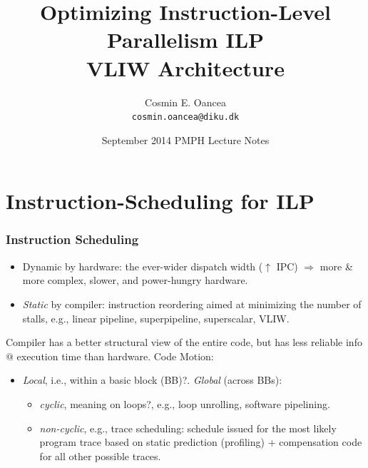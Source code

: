 \documentclass{beamer}
\title[VLIW Arch]{Optimizing Instruction-Level Parallelism ILP\\VLIW Architecture}
\author[C.~Oancea]{Cosmin E. Oancea\\{\tt cosmin.oancea@diku.dk}}
\institute{Department of Computer Science (DIKU)\\University of Copenhagen}
\date[Sept 2014]{September 2014 PMPH Lecture Notes}
\renewcommand{\emph}[1]{\textcolor{structure}{#1}}
\newcommand{\emp}[1]{\textcolor{DikuRed}{ #1}}
\begin{document}
\titleslide



\begin{frame}[fragile]
	\tableofcontents
\end{frame}


\section{Instruction-Scheduling for ILP}


\begin{frame}[fragile,t]
\frametitle{Instruction Scheduling}

\begin{itemize}
    \item {Dynamic} by hardware: the ever-wider dispatch width
            ($\uparrow$ IPC) $\Rightarrow$ 
            more \& more complex, slower, and power-hungry hardware. \smallskip
 
    \item {\em Static} by compiler: instruction reordering aimed at
            minimizing the number of stalls,
            e.g., linear pipeline, superpipeline, superscalar, VLIW.  
\end  {itemize}
\pause\bigskip

Compiler has a better structural view of the entire code, but has less reliable info 
@ execution time than hardware. Code Motion:
\smallskip
\begin{itemize}
    \item \emph{\em Local}, i.e., within a \alert{basic block (BB)?}. \emph{\em Global} (across BBs): 
    \begin{itemize}
        \item \emp{\em cyclic}, meaning on \alert{loops?}, e.g., loop unrolling, software pipelining.
        \item \emp{\em non-cyclic}, e.g., trace scheduling: schedule issued for the most likely 
                program trace based on static prediction (profiling) + compensation code 
                for all other possible traces.
    \end  {itemize}
\end  {itemize}

\end{frame}
\end{document}
